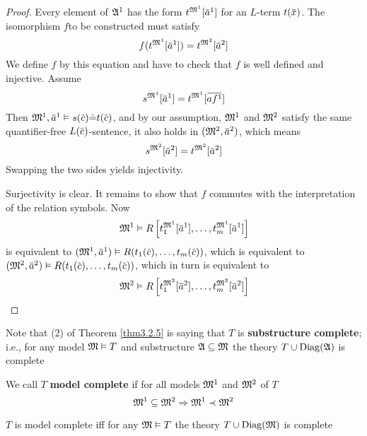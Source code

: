 \documentclass[11pt]{article}
\begin{document}
\begin{proof}
Every element of \(\mathfrak{A}^1\) has the form \(t^{\fM^1}[\bbar{a}^1]\) for an
\(L\)-term \(t(\bbar{x})\). The isomorphism \(f\)to be constructed must
satisfy
\begin{equation*}
f(t^{\fM^1}[\bbar{a}^1])=t^{\fM^2}[\bbar{a}^2]
\end{equation*}
We define \(f\) by this equation and have to check that \(f\) is well defined
and injective. Assume
\begin{equation*}
s^{\fM^1}[\bbar{a}^1]=t^{\fM^1}[\bbar{af^1}]
\end{equation*}
Then \(\fM^1,\bbar{a}^1\vDash s(\bbar{c})\dot{=}t(\bbar{c})\), and by our
assumption, \(\mathfrak{M}^1\) and \(\mathfrak{M}^2\) satisfy the same quantifier-free \(L(\barc)\)-sentence,  it also
holds in \((\fM^2,\bbar{a}^2)\), which means
\begin{equation*}
s^{\fM^2}[\bbar{a}^2]=t^{\fM^2}[\bbar{a}^2]
\end{equation*}
Swapping the two sides yields injectivity.

Surjectivity is clear. It remains to show that \(f\) commutes with the
interpretation of the relation symbols. Now
\begin{equation*}
\fM^1\vDash R\left[t_1^{\fM^1}[\bbar{a}^1],\dots,t_m^{\fM^1}[\bbar{a}^1]\right]
\end{equation*}
is equivalent to \((\fM^1,\bbar{a}^1)\vDash R(t_1(\bbar{c}),\dots,t_m(\bbar{c}))\), which is equivalent to
\((\fM^2,\bbar{a}^2)\vDash R(t_1(\bbar{c}),\dots,t_m(\bbar{c}))\), which in turn is equivalent to
\begin{equation*}
\fM^2\vDash R\left[t_1^{\fM^2}[\bbar{a}^2],\dots,t_m^{\fM^2}[\bbar{a}^2]\right]
\end{equation*}
\end{proof}

Note that (2) of Theorem \ref{thm3.2.5} is saying that \(T\) is \textbf{substructure
complete}; i.e., for any model \(\mathfrak{M}\vDash T\) and substructure
\(\mathfrak{A}\subseteq\mathfrak{M}\) the theory \(T\cup\operatorname{Diag}(\mathfrak{A})\) is complete

\begin{definition}[]
We call \(T\) \textbf{model complete} if for all models \(\mathfrak{M}^1\) and \(\mathfrak{M}^2\) of
\(T\)
\begin{equation*}
\mathfrak{M}^1\subseteq\mathfrak{M}^2\Rightarrow\mathfrak{M}^1\prec\mathfrak{M}^2
\end{equation*}
\end{definition}

\(T\) is model complete iff for any \(\mathfrak{M}\vDash T\) the theory
\(T\cup\operatorname{Diag}(\mathfrak{M})\) is complete
\end{document}
